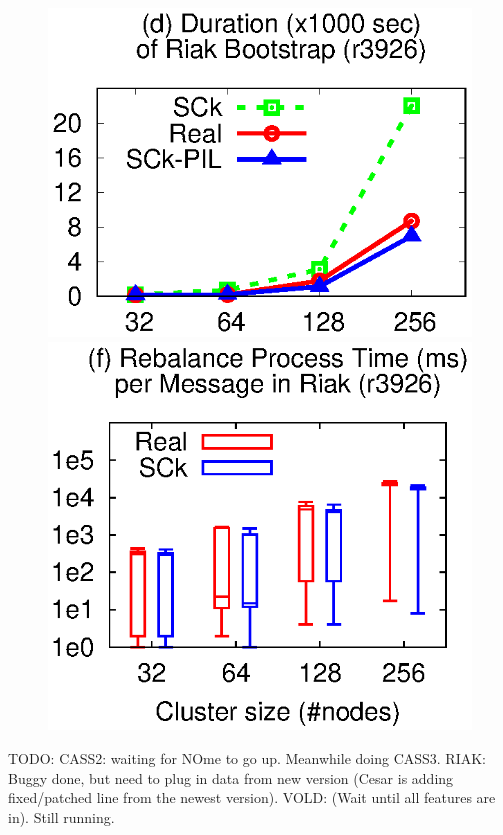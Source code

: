 \begin{figure}[t]
\centerline{
\hmina
\includegraphics[width=\fgw]{F/old-bugs/eps/riak1.eps}
\hminb
\includegraphics[width=\fgw]{F/riak/eps/proc.eps}
}

\vminfive

\vminfive
\end{figure}




TODO: CASS2: waiting for NOme to go up.
Meanwhile doing CASS3. 
%
RIAK: Buggy done, but need to plug in data from new version
(Cesar is adding fixed/patched line from the newest version).
%
VOLD: (Wait until all features are in).  Still running.
\fi
